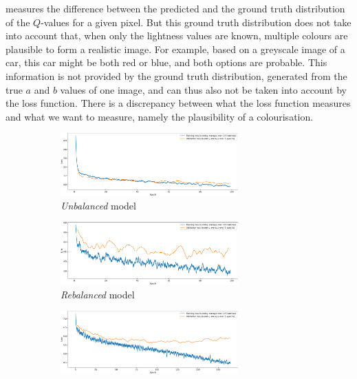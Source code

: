 \documentclass{article}
\begin{document}
measures the difference between the predicted and the ground truth distribution of the $Q$-values for
a given pixel. But this ground truth distribution does not take into account that, when only
the lightness values are known, multiple colours are plausible to form a realistic image.
For example, based on a greyscale image of a car, this car might be both red or blue, and
both options are probable. This information is not provided by the ground truth distribution, generated
from the true $a$ and $b$ values of one image, and can thus also not be taken into account by the
loss function.
There is a discrepancy between what the loss function measures and what we want to measure,
namely the plausibility of a colourisation.

\begin{figure}
    \centering
    \begin{subfigure}[b]{\textwidth}
        \centering
        \includegraphics[width=0.75\textwidth]{GRAPHS/unbalanced.png}
        \caption{\textit{Unbalanced} model}
    \end{subfigure}
    \begin{subfigure}[b]{\textwidth}
        \centering
        \includegraphics[width=0.75\textwidth]{GRAPHS/rebalanced.png}
        \caption{\textit{Rebalanced} model}
    \end{subfigure}
    \begin{subfigure}[b]{\textwidth}
        \centering
        \includegraphics[width=0.75\textwidth]{GRAPHS/rebalanced_ours_final.png}

\end{subfigure}
\end{figure}
\end{document}
